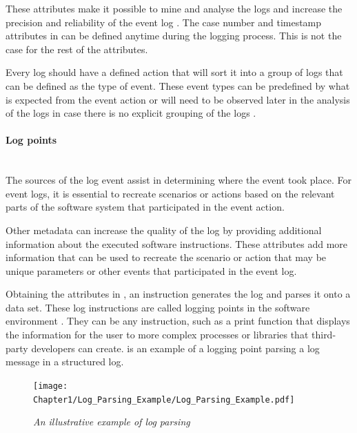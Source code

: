 These attributes make it possible to mine and analyse the logs and increase the precision and reliability of the event log \cite{Kherbouche2017}. The case number and timestamp attributes in  can be defined anytime during the logging process. This is not the case for the rest of the attributes. \par Every log should have a defined action that will sort it into a group of logs that can be defined as the type of event. These event types can be predefined by what is expected from the event action or will need to be observed later in the analysis of the logs in case there is no explicit grouping of the logs \cite{Bekeneva2020, Fedaghi2010}.

\paragraph{Log points}\leavevmode\\
The sources of the log event assist in determining where the event took place. For event logs, it is essential to recreate scenarios or actions based on the relevant parts of the software system that participated in the event action.\par Other metadata can increase the quality of the log by providing additional information about the executed software instructions. These attributes add more information that can be used to recreate the scenario or action that may be unique parameters or other events that participated in the event log.\par Obtaining the attributes in , an instruction generates the log and parses it onto a data set. These log instructions are called logging points in the software environment \cite{Pecchia2015, Zhu2015}. They can be any instruction, such as a print function that displays the information for the user to more complex processes or libraries that third-party developers can create.  is an example of a logging point parsing a log message in a structured log. 

\clearpage

\begin{figure}[!htb]
	\centering %
	\texttt{[image: Chapter1/Log\_Parsing\_Example/Log\_Parsing\_Example.pdf]}
	\caption[An illustrative example of log parsing]
	{\textit{An illustrative example of log parsing \cite{Zhu2019}}} \label{fig:ch1_logParsing}
\end{figure}

